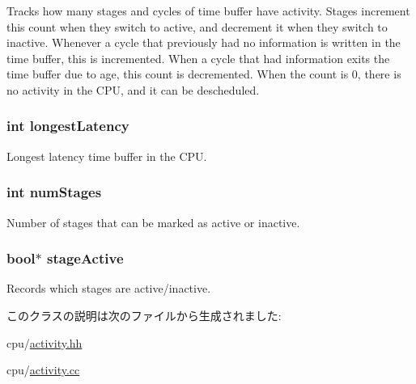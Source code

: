 Tracks how many stages and cycles of time buffer have activity. Stages increment this count when they switch to active, and decrement it when they switch to inactive. Whenever a cycle that previously had no information is written in the time buffer, this is incremented. When a cycle that had information exits the time buffer due to age, this count is decremented. When the count is 0, there is no activity in the CPU, and it can be descheduled. \hypertarget{classActivityRecorder_a20bd7fb0de8433f0f95dc50ed74bf620}{
\subsubsection[{longestLatency}]{\setlength{\rightskip}{0pt plus 5cm}int {\bf longestLatency}}}
\label{classActivityRecorder_a20bd7fb0de8433f0f95dc50ed74bf620}
Longest latency time buffer in the CPU. \hypertarget{classActivityRecorder_aaf4f71ec3fd6f4e154d09cd71c2c331b}{
\subsubsection[{numStages}]{\setlength{\rightskip}{0pt plus 5cm}int {\bf numStages}}}
\label{classActivityRecorder_aaf4f71ec3fd6f4e154d09cd71c2c331b}
Number of stages that can be marked as active or inactive. \hypertarget{classActivityRecorder_aebf0081a358874c1eedf8728e4a478a4}{
\subsubsection[{stageActive}]{\setlength{\rightskip}{0pt plus 5cm}bool$\ast$ {\bf stageActive}}}
\label{classActivityRecorder_aebf0081a358874c1eedf8728e4a478a4}
Records which stages are active/inactive. 

このクラスの説明は次のファイルから生成されました:\begin{DoxyCompactItemize}
\item 
cpu/\hyperlink{activity_8hh}{activity.hh}\item 
cpu/\hyperlink{activity_8cc}{activity.cc}\end{DoxyCompactItemize}
